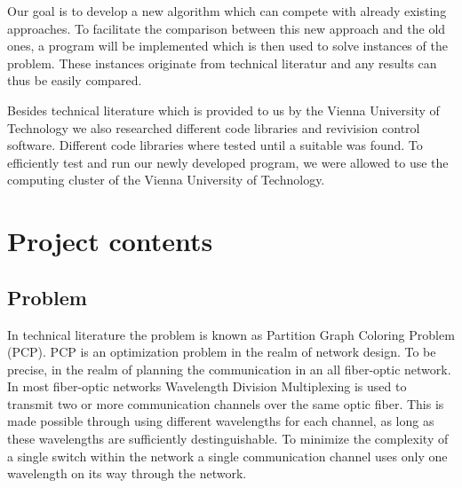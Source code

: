 \documentclass[paper=a4,fontsize=12pt]{scrartcl}
\begin{document}
Our goal is to develop a new algorithm which can compete with already existing approaches. To facilitate the comparison between this new approach and the old ones, a program will be implemented which is then used to solve instances of the problem. These instances originate from technical literatur and any results can thus be easily compared.


Besides technical literature which is provided to us by the Vienna University of Technology we also researched different code libraries and revivision control software. Different code libraries where tested until a suitable was found. To efficiently test and run our newly developed program, we were allowed to use the computing cluster of the Vienna University of Technology.


\section{Project contents}

\subsection{Problem}
In technical literature the problem is known as Partition Graph Coloring Problem (PCP). PCP is an optimization problem in the realm of network design. To be precise, in the realm of planning the communication in an all fiber-optic network. In most fiber-optic networks Wavelength Division Multiplexing is used to transmit two or more communication channels over the same optic fiber. This is made possible through using different wavelengths for each channel, as long as these wavelengths are sufficiently destinguishable. To minimize the complexity of a single switch within the network a single communication channel uses only one wavelength on its way through the network.
\end{document}
